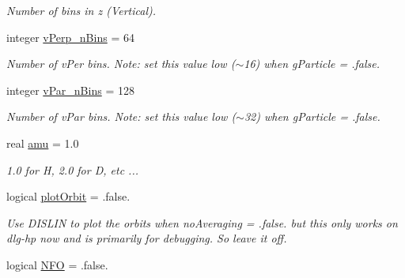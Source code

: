 \begin{CompactItemize}
\begin{CompactList}\small\item\em Number of bins in z (Vertical). \item\end{CompactList}\item 
\hypertarget{namespaceread__namelist_2f42d52d927cc50dc809082b1a8aba59}{
integer \hyperlink{namespaceread__namelist_2f42d52d927cc50dc809082b1a8aba59}{vPerp\_\-nBins} = 64}
\label{namespaceread__namelist_2f42d52d927cc50dc809082b1a8aba59}

\begin{CompactList}\small\item\em Number of vPer bins. Note: set this value low ($\sim$16) when gParticle = .false. \item\end{CompactList}\item 
\hypertarget{namespaceread__namelist_2a3d96bd7488590aa34bc912bb12d956}{
integer \hyperlink{namespaceread__namelist_2a3d96bd7488590aa34bc912bb12d956}{vPar\_\-nBins} = 128}
\label{namespaceread__namelist_2a3d96bd7488590aa34bc912bb12d956}

\begin{CompactList}\small\item\em Number of vPar bins. Note: set this value low ($\sim$32) when gParticle = .false. \item\end{CompactList}\item 
\hypertarget{namespaceread__namelist_c93f0e7fb65a49022b0de91021a97a48}{
real \hyperlink{namespaceread__namelist_c93f0e7fb65a49022b0de91021a97a48}{amu} = 1.0}
\label{namespaceread__namelist_c93f0e7fb65a49022b0de91021a97a48}

\begin{CompactList}\small\item\em 1.0 for H, 2.0 for D, etc ... \item\end{CompactList}\item 
\hypertarget{namespaceread__namelist_5b0d13f009c3fb69e62d4ad46eba1ef0}{
logical \hyperlink{namespaceread__namelist_5b0d13f009c3fb69e62d4ad46eba1ef0}{plotOrbit} = .false.}
\label{namespaceread__namelist_5b0d13f009c3fb69e62d4ad46eba1ef0}

\begin{CompactList}\small\item\em Use DISLIN to plot the orbits when noAveraging = .false. but this only works on dlg-hp now and is primarily for debugging. So leave it off. \item\end{CompactList}\item 
\hypertarget{namespaceread__namelist_ab9e7a4d953b0d80427d57f99d976afc}{
logical \hyperlink{namespaceread__namelist_ab9e7a4d953b0d80427d57f99d976afc}{NFO} = .false.}
\label{namespaceread__namelist_ab9e7a4d953b0d80427d57f99d976afc}


\end{CompactItemize}
